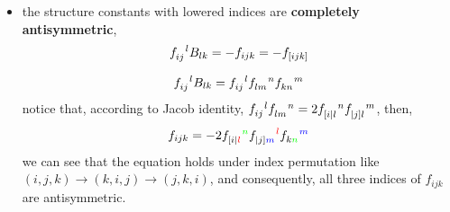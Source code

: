 \begin{itemize}
	\item the structure constants with lowered indices are \textbf{completely antisymmetric},
	\begin{equation}
		\tensor{f}{_{i j}^l} B_{l k} = - f_{i j k} = - f_{[i j k]}
	\end{equation}
	
	\begin{tcolorbox}[title=proof:]
		\begin{equation}
			\tensor{f}{_{i j}^l} B_{l k} = \tensor{f}{_{i j}^l} \tensor{f}{_{l m}^n} \tensor{f}{_{k n}^m}
		\end{equation}
		notice that, according to Jacob identity, $\tensor{f}{_{i j}^l} \tensor{f}{_{l m}^n} = 2 \tensor{f}{_{[i| l}^n} \tensor{f}{_{|j] l}^m}$, then,
		\begin{equation}
			f_{i j k} = - 2 \tensor{f}{_{[i| \mathcolor{red}{l}}^{\mathcolor{green}{n}}} \tensor{f}{_{|j] \mathcolor{blue}{m}}^{\mathcolor{red}{l}}} \tensor{f}{_{k \mathcolor{green}{n}}^{\mathcolor{blue}{m}}}
		\end{equation}
		we can see that the equation holds under index permutation like $(i, j, k) \rightarrow (k, i, j) \rightarrow (j, k, i)$, and consequently, all three indices of $f_{i j k}$ are antisymmetric.
	\end{tcolorbox}
\end{itemize}
